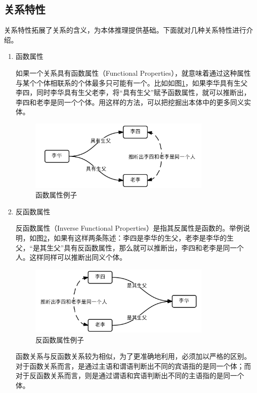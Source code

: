 \documentclass[12pt,a4paper]{article}
\newcommand{\wuhao}{\fontsize{10.5pt}{\baselineskip}\selectfont}
\begin{document}
	\subsection{关系特性}
	关系特性拓展了关系的含义，为本体推理提供基础。下面就对几种关系特性进行介绍。
\begin{enumerate}[(1)]

		\item 函数属性

	\quad \quad 如果一个关系具有函数属性（{\Times Functional Properties}），就意味着通过这种属性与某个个体相联系的个体最多只可能有一个。比如如图\ref{fig:函数属性例子}，如果李华具有生父李四，同时李华具有生父老李，将“具有生父”赋予函数属性，就可以推断出，李四和老李是同一个个体。用这样的方法，可以把挖掘出本体中的更多同义实体。	
	\begin{figure}[htbp] 
	\centering\includegraphics[width=3.5in]{fig/functionalPropertyExample.png} 
	\caption{\wuhao 函数属性例子}\label{fig:函数属性例子} 
	\end{figure} 
	
		\item 反函数属性

	\quad \quad 反函数属性（{\Times Inverse Functional Properties}）是指其反属性是函数的。举例说明，如图\ref{fig:反函数属性例子}，如果有这样两条陈述：李四是李华的生父，老李是李华的生父，“是其生父”具有反函数属性，那么就可以推断出，李四和老李是同一个人。这样同样可以推断出同义个体。
	
	\begin{figure}[htbp] 
	\centering\includegraphics[width=3.5in]{fig/inverseFunctionalPropertyExample.png} 
	\caption{\wuhao 反函数属性例子}\label{fig:反函数属性例子} 
	\end{figure} 
	
	\quad \quad 函数关系与反函数关系较为相似，为了更准确地利用，必须加以严格的区别。对于函数关系而言，是通过主语和谓语判断出不同的宾语指的是同一个体；而对于反函数关系而言，则是通过谓语和宾语判断出不同的主语指的是同一个体。
		

\end{enumerate}
\end{document}
